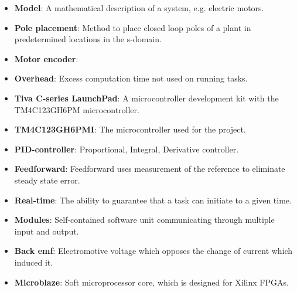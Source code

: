 \documentclass[../../main.tex]{subfiles}
\begin{document}
\begin{itemize}
    \item \textbf{Model}: A mathematical description of a system, e.g. electric motors. 
    \item \textbf{Pole placement}: Method to place closed loop poles of a plant in predetermined locations in the s-domain.
    \item \textbf{Motor encoder}:
    \item \textbf{Overhead}: Excess computation time not used on running tasks.
    \item \textbf{Tiva C-series LaunchPad}: A microcontroller development kit with the TM4C123GH6PM microcontroller.
    \item \textbf{TM4C123GH6PMI}: The microcontroller used for the project.
    
    
    
    \item \textbf{PID-controller}: Proportional, Integral, Derivative controller.
    \item \textbf{Feedforward}: Feedforward uses measurement of the reference to eliminate steady state error.
    \item \textbf{Real-time}: The ability to guarantee that a task can initiate to a given time.
    \item \textbf{Modules}: Self-contained software unit communicating through multiple input and output.
    \item \textbf{Back emf}: Electromotive voltage which opposes the change of current which induced it. 
    \item \textbf{Microblaze}: Soft microprocessor core, which is designed for Xilinx FPGAs.
\end{itemize}
\end{document}
